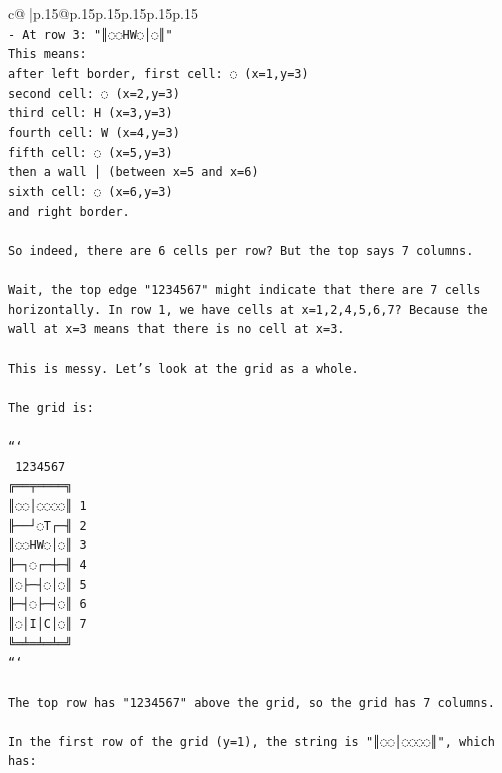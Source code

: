 \documentclass{article}
\begin{document}
{\begin{supertabular}{c@{$\;$}|p{.15\linewidth}@{}p{.15\linewidth}p{.15\linewidth}p{.15\linewidth}p{.15\linewidth}p{.15\linewidth}}
{{{\\ 
\texttt{{-} At row 3: "║◌◌HW◌│◌║"} \\
\texttt{This means: } \\
\texttt{after left border, first cell: ◌ (x=1,y=3)} \\
\texttt{second cell: ◌ (x=2,y=3)} \\
\texttt{third cell: H (x=3,y=3)} \\
\texttt{fourth cell: W (x=4,y=3)} \\
\texttt{fifth cell: ◌ (x=5,y=3)} \\
\texttt{then a wall │ (between x=5 and x=6)} \\
\texttt{sixth cell: ◌ (x=6,y=3)} \\
\texttt{and right border.} \\
\\ 
\texttt{So indeed, there are 6 cells per row? But the top says 7 columns.} \\
\\ 
\texttt{Wait, the top edge "1234567" might indicate that there are 7 cells horizontally. In row 1, we have cells at x=1,2,4,5,6,7? Because the wall at x=3 means that there is no cell at x=3.} \\
\\ 
\texttt{This is messy. Let's look at the grid as a whole.} \\
\\ 
\texttt{The grid is:} \\
\\ 
\texttt{```} \\
\texttt{ 1234567} \\
\texttt{╔══╤════╗} \\
\texttt{║◌◌│◌◌◌◌║ 1} \\
\texttt{╟──┘◌T┌─╢ 2} \\
\texttt{║◌◌HW◌│◌║ 3} \\
\texttt{╟─┐◌┌─┼─╢ 4} \\
\texttt{║◌├─┤◌│◌║ 5} \\
\texttt{╟─┤◌├─┤◌║ 6} \\
\texttt{║◌│I│C│◌║ 7} \\
\texttt{╚═╧═╧═╧═╝} \\
\texttt{```} \\
\\ 
\texttt{The top row has "1234567" above the grid, so the grid has 7 columns.} \\
\\ 
\texttt{In the first row of the grid (y=1), the string is "║◌◌│◌◌◌◌║", which has:} \\
}}}
\end{supertabular}}
\end{document}
